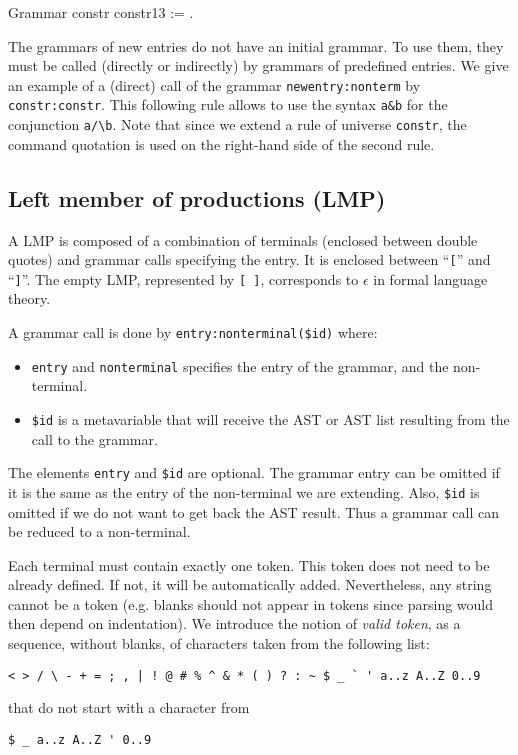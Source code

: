 {\begin{coq_example*}
Grammar constr constr13 := .
\end{coq_example*}

The grammars of new entries do not have an initial grammar. To use
them, they must be called (directly or indirectly) by grammars of
predefined entries. We give an example of a (direct) call of the
grammar {\tt newentry:nonterm} by {\tt constr:constr}.  This following
rule allows to use the syntax \verb+a&b+ for the conjunction
\verb+a/\b+. Note that since we extend a rule of universe
\verb+constr+, the command quotation is used on the right-hand side of
the second rule.



\subsection{Left member of productions (LMP)}

A LMP is composed of a combination of terminals (enclosed between
double quotes) and grammar calls specifying the entry. It is enclosed
between ``\verb+[+'' and ``\verb+]+''. The empty LMP, represented by
\verb+[ ]+, corresponds to $\epsilon$ in formal language theory.

A grammar call is done by \verb+entry:nonterminal($id)+ where:
\begin{itemize}
\item \verb+entry+ and \verb+nonterminal+ 
  specifies the entry of the grammar, and the non-terminal.
\item \verb+$id+ is a metavariable that will receive the AST or AST
  list resulting from the call to the grammar.
\end{itemize}

The elements \verb+entry+ and \verb+$id+ are optional. The grammar
entry can be omitted if it is the same as the entry of the
non-terminal we are extending. Also, \verb+$id+ is omitted if we do
not want to get back the AST result. Thus a grammar call can be
reduced to a non-terminal.

Each terminal must contain exactly one token. This token does not need
to be already defined. If not, it will be automatically
added. Nevertheless, any string cannot be a token (e.g. blanks should
not appear in tokens since parsing would then depend on
indentation). We introduce the notion of \emph{valid token}, as a
sequence, without blanks, of characters taken from the following list:
\begin{center}
\verb"< > / \ - + = ; , | ! @ # % ^ & * ( ) ? : ~ $ _ ` ' a..z A..Z 0..9"
\end{center}
that do not start with a character from
\begin{center}
\verb!$ _ a..z A..Z ' 0..9!
\end{center}

}
